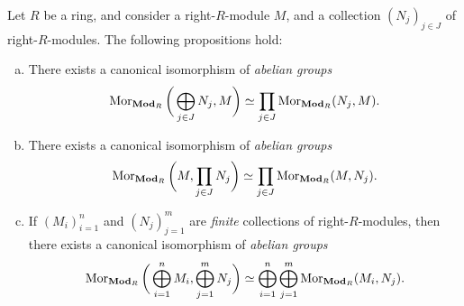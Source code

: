 \begin{proposition}
\label{prop:direct-sums-isos-hom-sets}
Let \(R\) be a ring, and consider a right-\(R\)-module \(M\), and a collection
\((N_j)_{j \in J}\) of right-\(R\)-modules. The following propositions hold:
\begin{enumerate}[(a)]\setlength\itemsep{0em}
\item There exists a canonical isomorphism of \emph{abelian groups}
  \[
  \operatorname{Mor}_{{\textbf{Mod}_{R}}}\bigg( \bigoplus_{j \in J} N_j, M \bigg) \simeq
  \prod_{j \in J} \operatorname{Mor}_{{\textbf{Mod}_{R}}}(N_j, M).
  \]

\item There exists a canonical isomorphism of \emph{abelian groups}
  \[
  \operatorname{Mor}_{{\textbf{Mod}_{R}}}\bigg( M, \prod_{j \in J} N_j \bigg) \simeq
  \prod_{j \in J} \operatorname{Mor}_{{\textbf{Mod}_{R}}}(M, N_j).
  \]
\item If \((M_i)_{i = 1}^n\) and \((N_j)_{j=1}^m\) are \emph{finite} collections
  of right-\(R\)-modules, then there exists a canonical isomorphism of
  \emph{abelian groups}
  \[
  \operatorname{Mor}_{{\textbf{Mod}_{R}}} \bigg( \bigoplus_{i=1}^n M_i, \bigoplus_{j=1}^m N_j \bigg)
  \simeq
  \bigoplus_{i=1}^n \bigoplus_{j=1}^m \operatorname{Mor}_{{\textbf{Mod}_{R}}}(M_i, N_j).
  \]
\end{enumerate}
\end{proposition}

